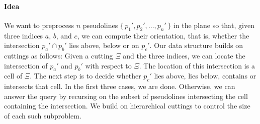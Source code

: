 \paragraph*{Idea} We want to preprocess \(n\) pseudolines \( \{\, p_1' ,
p_2' , \ldots, p_n'\,\} \) in the plane so that, given three indices \(a\),
\(b\), and \(c\), we can compute their orientation, that is, whether the
intersection \(p_a' \cap p_b'\) lies above, below or on \(p_c'\). Our
data structure builds on cuttings as follows: Given a cutting \(\Xi\) and the
three indices, we can locate the intersection of \(p_a'\) and \(p_b'\)
with respect to \(\Xi\). The location of this intersection is a cell of
\(\Xi\). The next step is to decide whether \(p_c'\) lies above, lies below,
contains or intersects that cell. In the first three cases, we are done.
Otherwise, we can answer the query by recursing on the subset of pseudolines
intersecting the cell containing the intersection. We build on hierarchical
cuttings to control the size of each such subproblem.
